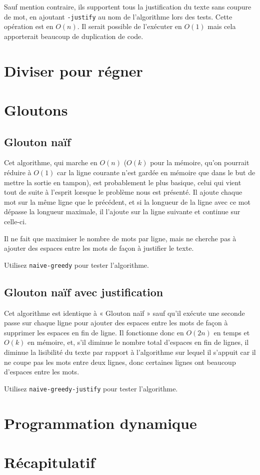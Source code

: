 \documentclass{article}
\begin{document}
Sauf mention contraire, ils supportent tous la justification du texte sans
coupure de mot, en ajoutant \verb|-justify| au nom de l'algorithme lors des
tests. Cette opération est en $O(n)$. Il serait possible de l'exécuter en $O(1)$
mais cela apporterait beaucoup de duplication de code.

\section{Diviser pour régner}

\section{Gloutons}

\subsection{Glouton naïf}

Cet algorithme, qui marche en $O(n)$ ($O(k)$ pour la mémoire, qu'on pourrait
réduire à $O(1)$ car la ligne courante n'est gardée en mémoire que dans le but
de mettre la sortie en tampon), est probablement le plus basique, celui qui vient
tout de suite à l'esprit lorsque le problème nous est présenté. Il ajoute chaque
mot sur la même ligne que le précédent, et si la longueur de la ligne avec ce
mot dépasse la longueur maximale, il l'ajoute sur la ligne suivante et continue
sur celle-ci.

Il ne fait que maximiser le nombre de mots par ligne, mais ne cherche pas à
ajouter des espaces entre les mots de façon à justifier le texte.

Utilisez \verb|naive-greedy| pour tester l’algorithme.

\subsection{Glouton naïf avec justification}

Cet algorithme est identique à « Glouton naïf » sauf qu'il exécute une seconde
passe sur chaque ligne pour ajouter des espaces entre les mots de façon à
supprimer les espaces en fin de ligne. Il fonctionne donc en $O(2n)$ en temps et
$O(k)$ en mémoire, et, s'il diminue le nombre total d'espaces en fin de lignes,
il diminue la lisibilité du texte par rapport à l'algorithme sur lequel il
s'appuit car il ne coupe pas les mots entre deux lignes, donc certaines lignes
ont beaucoup d'espaces entre les mots.

Utilisez \verb|naive-greedy-justify| pour tester l’algorithme.

\section{Programmation dynamique}

\section{Récapitulatif}
\end{document}
